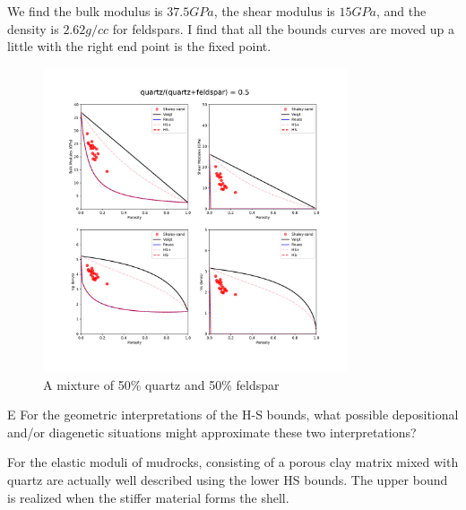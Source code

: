 \begin{solution}

    We find the bulk modulus is $37.5 GPa$, the shear modulus is $15 GPa$, and the density is $2.62 g/cc$ for feldspars.
    I find that all the bounds curves are moved up a little with the right end point is the fixed point.
    \begin{figure}[H]
        \centering
        \includegraphics[width=0.8\textwidth]{figures/homework-1/p1-problem-d.pdf}
        \caption{A mixture of 50\% quartz and 50\% feldspar}
        \label{fig:p1-problem-d}
    \end{figure}
\end{solution}


\begin{problem}{E}
    For the geometric interpretations of the H-S bounds, what possible depositional and/or diagenetic situations might approximate these two interpretations?
\end{problem}

\begin{solution}

    For the elastic moduli of mudrocks, consisting of a porous clay matrix mixed with quartz are actually well described using the lower HS bounds.
    The upper bound is realized when the stiffer material forms the shell.

\end{solution}












